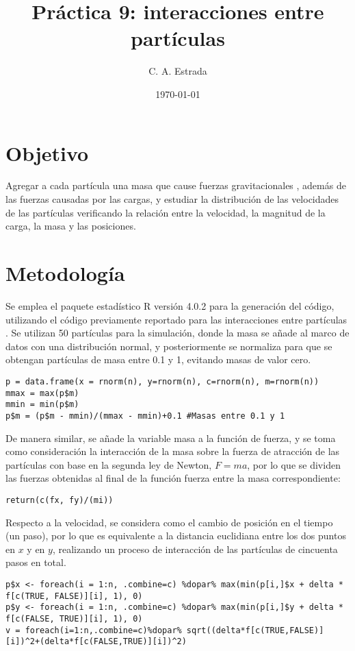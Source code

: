 \documentclass{article}
\title{\bf Práctica 9: interacciones entre partículas}
\date{\today}
\author{C. A. Estrada}
\begin{document}
\maketitle

\section{Objetivo}
Agregar a cada partícula una masa que cause fuerzas gravitacionales \cite{dra}, además de las fuerzas causadas por las cargas, y estudiar la distribución de las velocidades de las partículas verificando la relación entre la velocidad, la magnitud de la carga, la masa y las posiciones.

\section{Metodología}
Se emplea el paquete estadístico R versión 4.0.2 \cite{R} para la generación del código, utilizando el código previamente reportado para las interacciones entre partículas \cite{dra, ang}. Se utilizan 50 partículas para la simulación, donde la masa se añade al marco de datos con una distribución normal, y posteriormente se normaliza para que se obtengan partículas de masa entre 0.1 y 1, evitando masas de valor cero.
\begin{lstlisting}
p = data.frame(x = rnorm(n), y=rnorm(n), c=rnorm(n), m=rnorm(n))
mmax = max(p$m)
mmin = min(p$m)
p$m = (p$m - mmin)/(mmax - mmin)+0.1 #Masas entre 0.1 y 1
\end{lstlisting}

De manera similar, se añade la variable masa a la función de fuerza, y se toma como consideración la interacción de la masa sobre la fuerza de atracción de las partículas con base en la segunda ley de Newton, $F=ma$, por lo que se dividen las fuerzas obtenidas al final de la función fuerza entre la masa correspondiente: 
\begin{lstlisting}
return(c(fx, fy)/(mi)) 
\end{lstlisting}

Respecto a la velocidad, se considera como el cambio de posición en el tiempo (un paso), por lo que es equivalente a la distancia euclidiana entre los dos puntos en $x$ y en $y$, realizando un proceso de interacción de las partículas de cincuenta pasos en total.
\begin{lstlisting}
p$x <- foreach(i = 1:n, .combine=c) %dopar% max(min(p[i,]$x + delta * f[c(TRUE, FALSE)][i], 1), 0)
p$y <- foreach(i = 1:n, .combine=c) %dopar% max(min(p[i,]$y + delta * f[c(FALSE, TRUE)][i], 1), 0)
v = foreach(i=1:n,.combine=c)%dopar% sqrt((delta*f[c(TRUE,FALSE)][i])^2+(delta*f[c(FALSE,TRUE)][i])^2)
\end{lstlisting}
\end{document}
